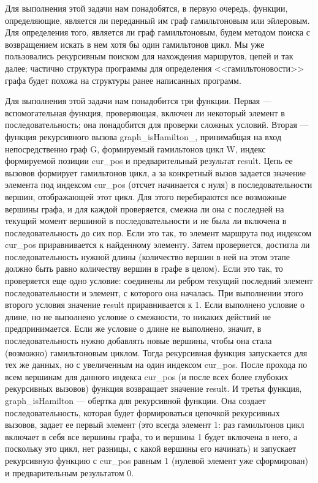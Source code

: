 \documentclass[12pt]{article}
\begin{document}
	Для выполнения этой задачи нам понадобятся, в первую очередь, функции, определяющие, является ли переданный им граф гамильтоновым или эйлеровым. Для определения того, является ли граф  гамильтоновым, будем методом поиска с возвращением искать в нем хотя бы один гамильтонов цикл. Мы уже пользовались рекурсивным поиском для нахождения маршрутов, цепей и так далее; частично структура программы для определения <<гамильтоновости>> графа будет похожа на структуры ранее написанных программ.
	
	Для выполнения этой задачи нам понадобится три функции. Первая --- вспомогательная функция, проверяющая, включен ли некоторый элемент в последовательность; она понадобится для проверки сложных условий. Вторая --- функция рекурсивного вызова graph\_isHamilton\_, принимабщая на вход непосредственно граф G, формируемый гамильтонов цикл W, индекс формируемой позиции cur\_pos и предварительный результат result. Цепь ее вызовов формирует гамильтонов цикл, а за конкретный вызов задается значение элемента под индексом cur\_pos (отсчет начинается с нуля) в последовательности вершин, отображающей этот цикл. Для этого перебираются все возможные вершины графа, и для каждой проверяется, смежна ли она с последней на текущий момент вершиной в последовательности и не была ли включена в последовательность до сих пор. Если это так, то элемент маршрута под индексом cur\_pos приравнивается к найденному элементу. Затем проверяется, достигла ли последовательность нужной длины (количество вершин в ней на этом этапе должно быть равно количеству вершин в графе в целом). Если это так, то проверяется еще одно условие: соединены ли ребром текущий последний элемент последовательности и элемент, с которого она началась. При выполнении этого второго условия значение result приравнивается к 1. Если выполнено условие о длине, но не выполнено условие о смежности, то никаких действий не предпринимается. Если же условие о длине не выполнено, значит, в последовательность нужно добавлять новые вершины, чтобы она стала (возможно) гамильтоновым циклом. Тогда рекурсивная функция запускается для тех же данных, но с увеличенным на один индексом cur\_pos. После прохода по всем вершинам для данного индекса cur\_pos (и после всех более глубоких рекурсивных вызовов) функция возвращает значение result. И третья функция, graph\_isHamilton --- обертка для рекурсивной функции. Она создает последовательность, которая будет формироваться цепочкой рекурсивных вызовов, задает ее первый элемент (это всегда элемент 1: раз гамильтонов цикл включает в себя все вершины графа, то и вершина 1 будет включена в него, а поскольку это цикл, нет разницы, с какой вершины его начинать) и запускает рекурсивную функцию с cur\_pos равным 1 (нулевой элемент уже сформирован) и предварительным результатом 0.
	
\end{document}
